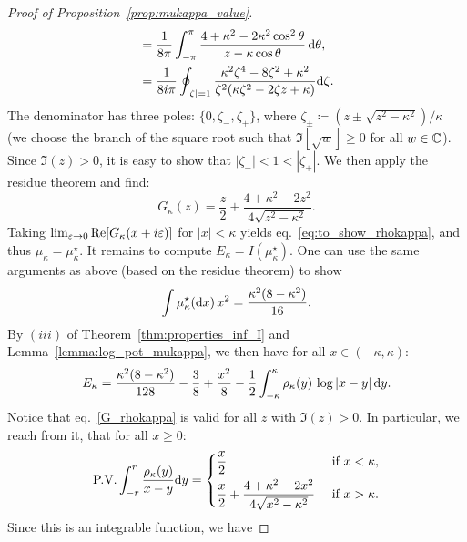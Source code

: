 {\begin{proof}[Proof of Proposition~\ref{prop:mukappa_value}]
\begin{align*}
        &= \frac{1}{8\pi} \int_{-\pi}^\pi \frac{4+\kappa^2 -2 \kappa^2 \cos^2 \theta}{z - \kappa \cos \theta} \, \mathrm{d} \theta, \\
        &= \frac{1}{8 i\pi} \oint_{|\zeta| = 1} \frac{\kappa^2 \zeta^4 - 8 \zeta^2 + \kappa^2}{\zeta^2(\kappa\zeta^2 -2 \zeta z + \kappa)} \mathrm{d} \zeta.
    \end{align*}
    The denominator has three poles: $\{0, \zeta_-, \zeta_+\}$, where $\zeta_{\pm} \coloneqq (z \pm \sqrt{z^2-\kappa^2})/\kappa$ (we choose the branch of the square root such that $\Im[\sqrt{w}] \geq 0$ for all $w \in \mathbb{C}$).
    Since $\Im(z) > 0$, it is easy to show that $|\zeta_-| < 1 < |\zeta_+|$.
    We then apply the residue theorem and find:
    \begin{equation}\label{G_rhokappa}
        G_\kappa(z) = \frac{z}{2} + \frac{4+\kappa^2-2z^2}{4\sqrt{z^2-\kappa^2}}.
    \end{equation}
    Taking $\lim_{\varepsilon \to 0} \mathrm{Re}[G_\kappa(x+i \varepsilon)]$ for $|x| < \kappa$ yields eq.~\eqref{eq:to_show_rhokappa}, and thus $\mu_\kappa = \mu_\kappa^\star$. 
    It remains to compute $E_\kappa = I(\mu_\kappa^\star)$.
    One can use the same arguments as above (based on the residue theorem) to show 
    \begin{equation}
        \label{eq:int_mukappa_x2}
        \int \mu_\kappa^\star(\mathrm{d} x) \, x^2 = \frac{\kappa^2(8-\kappa^2)}{16}. 
    \end{equation}
    By $(iii)$ of Theorem~\ref{thm:properties_inf_I} and Lemma~\ref{lemma:log_pot_mukappa},
    we then have for all $x \in (-\kappa,\kappa)$:
    \begin{equation}
        \label{eq:Ekappa_1}
        E_\kappa = \frac{\kappa^2(8-\kappa^2)}{128} - \frac{3}{8} + \frac{x^2}{8} - \frac{1}{2} \int_{-\kappa}^\kappa \rho_\kappa(y) \, \log |x-y| \, \mathrm{d} y.  
    \end{equation}
    Notice that eq.~\eqref{G_rhokappa} is valid for all $z$ with $\Im(z) > 0$. In particular, we reach from it, that for all $x \geq 0$:
    \begin{equation*}
        \textrm{P.V.}\int_{-r}^r \frac{\rho_\kappa(y)}{x-y} \mathrm{d} y =
        \begin{dcases}
            \frac{x}{2} & \textrm{ if } x < \kappa, \\ 
            \frac{x}{2} + \frac{4+\kappa^2-2x^2}{4\sqrt{x^2-\kappa^2}} & \textrm{ if } x > \kappa.
        \end{dcases}
    \end{equation*}
    Since this is an integrable function, we have

\end{proof}}
